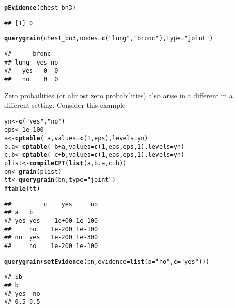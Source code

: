 \documentclass[10pt]{article}\usepackage[]{graphicx}\usepackage[]{color}
\makeatletter
\newcommand{\hlnum}[1]{\textcolor[rgb]{0.686,0.059,0.569}{#1}}%
\newcommand{\hlstr}[1]{\textcolor[rgb]{0.192,0.494,0.8}{#1}}%
\newcommand{\hlopt}[1]{\textcolor[rgb]{0,0,0}{#1}}%
\newcommand{\hlstd}[1]{\textcolor[rgb]{0.345,0.345,0.345}{#1}}%
\newcommand{\hlkwb}[1]{\textcolor[rgb]{0.69,0.353,0.396}{#1}}%
\newcommand{\hlkwc}[1]{\textcolor[rgb]{0.333,0.667,0.333}{#1}}%
\newcommand{\hlkwd}[1]{\textcolor[rgb]{0.737,0.353,0.396}{\textbf{#1}}}%
\newenvironment{kframe}{%
 \def\at@end@of@kframe{}%
 \ifinner\ifhmode%
  \def\at@end@of@kframe{\end{minipage}}%
  \begin{minipage}{\columnwidth}%
 \fi\fi%
 \def\FrameCommand##1{\hskip\@totalleftmargin \hskip-\fboxsep
 \colorbox{shadecolor}{##1}\hskip-\fboxsep
     \hskip-\linewidth \hskip-\@totalleftmargin \hskip\columnwidth}%
 \MakeFramed {\advance\hsize-\width
   \@totalleftmargin\z@ \linewidth\hsize
   \@setminipage}}%
 {\par\unskip\endMakeFramed%
 \at@end@of@kframe}
\newenvironment{knitrout}{}{} %
\makeatother
\begin{document}
\begin{knitrout}
\color{fgcolor}\begin{kframe}
\begin{alltt}
\hlkwd{pEvidence}\hlstd{(chest_bn3)}
\end{alltt}
\begin{verbatim}
## [1] 0
\end{verbatim}
\begin{alltt}
\hlkwd{querygrain}\hlstd{(chest_bn3,} \hlkwc{nodes}\hlstd{=}\hlkwd{c}\hlstd{(}\hlstr{"lung"}\hlstd{,} \hlstr{"bronc"}\hlstd{),} \hlkwc{type}\hlstd{=}\hlstr{"joint"}\hlstd{)}
\end{alltt}
\begin{verbatim}
##      bronc
## lung  yes no
##   yes   0  0
##   no    0  0
\end{verbatim}
\end{kframe}
\end{knitrout}



Zero probailities (or almost zero probabilities) also arise in a
different in a different setting. Consider this example

\begin{knitrout}
\color{fgcolor}\begin{kframe}
\begin{alltt}
\hlstd{yn} \hlkwb{<-} \hlkwd{c}\hlstd{(}\hlstr{"yes"}\hlstd{,}\hlstr{"no"}\hlstd{)}
\hlstd{eps} \hlkwb{<-} \hlnum{1e-100}
\hlstd{a}    \hlkwb{<-} \hlkwd{cptable}\hlstd{(}\hlopt{~}\hlstd{a,}   \hlkwc{values}\hlstd{=}\hlkwd{c}\hlstd{(}\hlnum{1}\hlstd{, eps),} \hlkwc{levels}\hlstd{=yn)}
\hlstd{b.a}  \hlkwb{<-} \hlkwd{cptable}\hlstd{(}\hlopt{~}\hlstd{b}\hlopt{+}\hlstd{a,} \hlkwc{values}\hlstd{=}\hlkwd{c}\hlstd{(}\hlnum{1}\hlstd{, eps, eps,} \hlnum{1}\hlstd{),} \hlkwc{levels}\hlstd{=yn)}
\hlstd{c.b}  \hlkwb{<-} \hlkwd{cptable}\hlstd{(}\hlopt{~}\hlstd{c}\hlopt{+}\hlstd{b,} \hlkwc{values}\hlstd{=}\hlkwd{c}\hlstd{(}\hlnum{1}\hlstd{, eps, eps,} \hlnum{1}\hlstd{),} \hlkwc{levels}\hlstd{=yn)}
\hlstd{plist} \hlkwb{<-} \hlkwd{compileCPT}\hlstd{(}\hlkwd{list}\hlstd{(a, b.a, c.b))}
\hlstd{bn}   \hlkwb{<-} \hlkwd{grain}\hlstd{(plist)}
\hlstd{tt}   \hlkwb{<-} \hlkwd{querygrain}\hlstd{(bn,} \hlkwc{type}\hlstd{=}\hlstr{"joint"}\hlstd{)}
\hlkwd{ftable}\hlstd{(tt)}
\end{alltt}
\begin{verbatim}
##         c    yes     no
## a   b                  
## yes yes    1e+00 1e-100
##     no    1e-200 1e-100
## no  yes   1e-200 1e-300
##     no    1e-200 1e-100
\end{verbatim}
\begin{alltt}
\hlkwd{querygrain}\hlstd{(}\hlkwd{setEvidence}\hlstd{(bn,} \hlkwc{evidence}\hlstd{=}\hlkwd{list}\hlstd{(}\hlkwc{a}\hlstd{=}\hlstr{"no"}\hlstd{,} \hlkwc{c}\hlstd{=}\hlstr{"yes"}\hlstd{)))}
\end{alltt}
\begin{verbatim}
## $b
## b
## yes  no 
## 0.5 0.5
\end{verbatim}
\end{kframe}
\end{knitrout}
\end{document}
